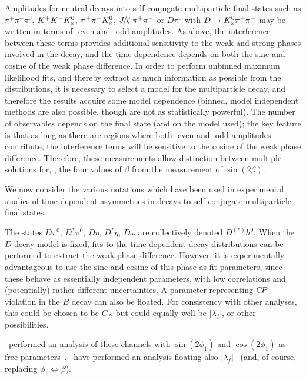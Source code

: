Amplitudes for neutral \B decays into 
self-conjugate multiparticle final states
such as $\pi^+\pi^-\pi^0$, $K^+K^-K^0_{\scriptscriptstyle S}$, $\pi^+\pi^-K^0_{\scriptscriptstyle S}$,
${J\mskip -3mu/\mskip -2mu\psi\mskip 2mu} \pi^+\pi^-$ or $D\pi^0$ with $D \to K^0_{\scriptscriptstyle S}\pi^+\pi^-$
may be written in terms of \CP-even and \CP-odd amplitudes.
As above, the interference between these terms 
provides additional sensitivity to the weak and strong phases
involved in the decay,
and the time-dependence depends on both the sine and cosine
of the weak phase difference.
In order to perform unbinned maximum likelihood fits,
and thereby extract as much information as possible from the distributions,
it is necessary to select a model for the multiparticle decay,
and therefore the results acquire some model dependence
(binned, model independent methods are also possible,
though are not as statistically powerful).
The number of observables depends on the final state (and on the model used);
the key feature is that as long as there are regions where both
\CP-even and \CP-odd amplitudes contribute,
the interference terms will be sensitive to the cosine 
of the weak phase difference.
Therefore, these measurements allow distinction between multiple solutions
for, \eg, the four values of $\beta$ from the measurement of $\sin(2\beta)$.

We now consider the various notations which have been used 
in experimental studies of
time-dependent asymmetries in decays to self-conjugate multiparticle final states.

\label{sec:cp_uta:notations:dalitz:dh0}

The states $D\pi^0$, $D^*\pi^0$, $D\eta$, $D^*\eta$, $D\omega$
are collectively denoted $D^{(*)}h^0$.
When the $D$ decay model is fixed,
fits to the time-dependent decay distributions can be performed
to extract the weak phase difference.
However, it is experimentally advantageous to use the sine and cosine of 
this phase as fit parameters, since these behave as essentially 
independent parameters, with low correlations and (potentially)
rather different uncertainties.
A parameter representing $C\!P$ violation in the $B$ decay 
can also be floated.  
For consistency with other analyses, this could be chosen to be $C_f$,
but could equally well be $\left| \lambda_f \right|$, or other possibilities.

\belle\ performed an analysis of these channels
with $\sin(2\phi_1)$ and $\cos(2\phi_1)$ as free parameters~\cite{Krokovny:2006sv}.
\babar\ have performed an analysis floating also $\left| \lambda_f \right|$~\cite{Aubert:2007rp}
(and, of course, replacing $\phi_1 \Leftrightarrow \beta$).

